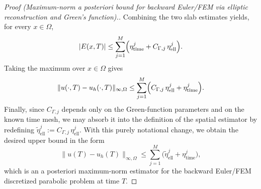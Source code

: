 \documentclass{article}
\begin{document}
\begin{proof}[Proof (Maximum-norm a posteriori bound for backward Euler/FEM via elliptic reconstruction and Green’s function).]
Combining the two slab estimates yields, for every $x\in\Omega$,
\[
|E(x,T)|\le \sum_{j=1}^M \Bigl(\eta^j_{\mathrm{time}}+C_{\Gamma,j}\,\eta^j_{\mathrm{ell}}\Bigr).
\]
Taking the maximum over $x\in\Omega$ gives
\[
\|u(\cdot,T)-u_h(\cdot,T)\|_{\infty,\Omega}\le \sum_{j=1}^M \Bigl(C_{\Gamma,j}\,\eta^j_{\mathrm{ell}}+\eta^j_{\mathrm{time}}\Bigr).
\]
Finally, since $C_{\Gamma,j}$ depends only on the Green-function parameters and on the known time mesh, we may absorb it into the definition of the spatial estimator by redefining $\tilde{\eta}^j_{\mathrm{ell}}:=C_{\Gamma,j}\,\eta^j_{\mathrm{ell}}$. With this purely notational change, we obtain the desired upper bound in the form
\[
\|u(T)-u_h(T)\|_{\infty,\Omega}\le \sum_{j=1}^M \bigl(\tilde{\eta}^j_{\mathrm{ell}}+\eta^j_{\mathrm{time}}\bigr),
\]
which is an a posteriori maximum-norm estimator for the backward Euler/FEM discretized parabolic problem at time $T$.
\end{proof}
\end{document}
